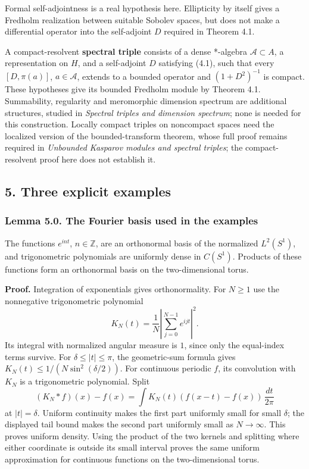\documentclass[
  11pt,
]{article}
\begin{document}
Formal self-adjointness is a real hypothesis here. Ellipticity by itself
gives a Fredholm realization between suitable Sobolev spaces, but does
not make a differential operator into the self-adjoint \(D\) required in
Theorem 4.1.

A compact-resolvent \textbf{spectral triple} consists of a dense
*-algebra \(\mathcal A\subset A\), a representation on \(H\), and a
self-adjoint \(D\) satisfying (4.1), such that every \([D,\pi(a)]\),
\(a\in\mathcal A\), extends to a bounded operator and \((1+D^2)^{-1}\)
is compact. These hypotheses give its bounded Fredholm module by Theorem
4.1. Summability, regularity and meromorphic dimension spectrum are
additional structures, studied in \emph{Spectral triples and dimension
spectrum}; none is needed for this construction. Locally compact triples
on noncompact spaces need the localized version of the bounded-transform
theorem, whose full proof remains required in \emph{Unbounded Kasparov
modules and spectral triples}; the compact-resolvent proof here does not
establish it.

\subsection{5. Three explicit examples}\label{three-explicit-examples}

\subsubsection{Lemma 5.0. The Fourier basis used in the
examples}\label{lemma-5.0.-the-fourier-basis-used-in-the-examples}

The functions \(e^{int}\), \(n\in\mathbb Z\), are an orthonormal basis
of the normalized \(L^2(S^1)\), and trigonometric polynomials are
uniformly dense in \(C(S^1)\). Products of these functions form an
orthonormal basis on the two-dimensional torus.

\textbf{Proof.} Integration of exponentials gives orthonormality. For
\(N\geq1\) use the nonnegative trigonometric polynomial \[
K_N(t)=\frac1N\left|\sum_{j=0}^{N-1}e^{ijt}\right|^2 .
\] Its integral with normalized angular measure is \(1\), since only the
equal-index terms survive. For \(\delta\leq|t|\leq\pi\), the
geometric-sum formula gives \(K_N(t)\leq1/(N\sin^2(\delta/2))\). For
continuous periodic \(f\), its convolution with \(K_N\) is a
trigonometric polynomial. Split \[
(K_N*f)(x)-f(x)=\int K_N(t)(f(x-t)-f(x))\,\frac{dt}{2\pi}
\] at \(|t|=\delta\). Uniform continuity makes the first part uniformly
small for small \(\delta\); the displayed tail bound makes the second
part uniformly small as \(N\to\infty\). This proves uniform density.
Using the product of the two kernels and splitting where either
coordinate is outside its small interval proves the same uniform
approximation for continuous functions on the two-dimensional torus.
\end{document}

